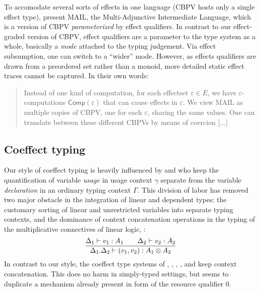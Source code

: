 \documentclass[acmsmall,review,anonymous]{acmart}\settopmatter{printfolios=true,printccs=false,printacmref=false}
\theoremstyle{remark}
\begin{document}
To accomodate several sorts of effects in one language (CBPV hosts
only a single effect type), \citet{kammarPlotkin:popl12} present MAIL,
the Multi-Adjunctive Intermediate Language, which is a version of CBPV
\emph{parameterized} by effect qualifiers.  In contrast to our
effect-graded version of CBPV, effect qualifiers are a parameter to
the type system as a whole, basically a \emph{mode} attached to the
typing judgement.  Via effect subsumption, one can switch to a
``wider'' mode.  However, as effects qualifiers are drawn from a
preordered set rather than a monoid, more detailed static effect
traces cannot be captured.  In their own words:
\begin{quotation}
  Instead of one kind of computation, for each effectset
  $\varepsilon \in E$, we have $\varepsilon$-computations
  $\mathsf{Comp}(\varepsilon)$ that can cause effects in
  \ensuremath{\varepsilon}. We view MAIL as multiple copies of CBPV,
  one for each \ensuremath{\varepsilon}, sharing the same values. One
  can translate between these different CBPVs by means of coercion
  [...]
\end{quotation}


\subsection{Coeffect typing}

Our style of coeffect typing is heavily influenced by
\citet{mcBride:wadler60} and \citet{atkey:lics18} who keep the
quantification of variable \emph{usage} in usage context $\gamma$
separate from the variable
\emph{declaration} in an ordinary typing context $\Gamma$.  This
division of labor has removed two major obstacle in the integration of
linear and dependent types: the customary sorting of linear and
unrestricted variables into separate typing contexts, and the
dominance of context concatenation operations in the typing of
the multiplicative connectives of linear logic, \eg:
\[
  \dfrac{\Delta_1 \vdash v_1 : A_1 \qquad
      \Delta_2 \vdash v_2 : A_2
    }{\Delta_1.\Delta_2 \vdash (v_1, v_2) : A_1 \otimes A_2}
\]
In contrast to our style, the coeffect type systems of
\citet{reedPierce:icfp10},
\citet{orchard:icfp14},
\citet{brunel:esop14},
\citet{ghicaSmith:esop14}, and
\citet{orchard:icfp19}
keep context concatenation. This does no harm in simply-typed settings,
but seems to duplicate a mechanism already present in form of the
resource qualifier $0$.
\end{document}
